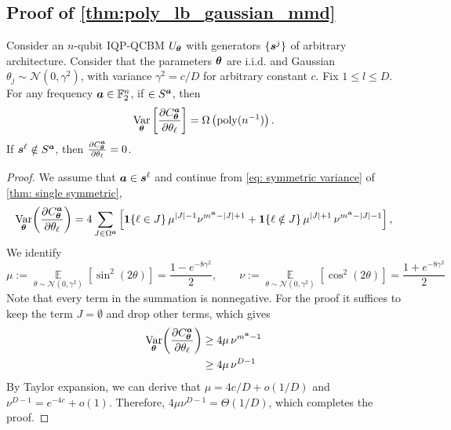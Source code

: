 \documentclass{article}
\theoremstyle{plain}
\theoremstyle{definition}
\theoremstyle{remark}
\begin{document}
\subsection{Proof of \cref{thm:poly_lb_gaussian_mmd}}
Consider an $n$-qubit IQP-QCBM $U_{\bm{\theta}}$ with generators $\{{\bm{s}^j}\}$ of arbitrary architecture. Consider that the parameters ${\bm{\theta}}$ are i.i.d. and Gaussian $\theta_j \sim\mathcal{N}(0,\gamma^2)$, with variance $\gamma^2 = c/D$ for arbitrary constant $c$. Fix $1\leq l \leq D$. For any frequency ${\bm{a}} \in \mathbb{F}_2^n$, if $\in S^{\bm{a}}$, then 
\begin{equation}
\operatorname*{Var}_{{\bm{\theta}}} \left[ \frac{\partial C^{\bm{a}}_{\bm{\theta}}}{\partial \theta_\ell} \right] = \Omega\left(\mathrm{poly}(n^{-1})\right).
\end{equation} 
If ${\bm{s}^\ell} \notin S^{\bm{a}}$, then $\frac{\partial C^{\bm{a}}_{\bm{\theta}}}{\partial \theta_\ell}=0$.
\begin{proof}
We assume that ${\bm{a}} \in {\bm{s}^\ell}$ and continue from \cref{eq: symmetric variance} of \cref{thm: single symmetric},
\begin{equation}
\operatorname*{Var}_{{\bm{\theta}}}\!\left(\frac{\partial C_{\bm{\theta}}^{\bm{a}}}{\partial\theta_\ell}\right)
=
4\sum_{J\in \Omega^{\bm{a}}}
\left[
\bm{1}\{\ell\in J\}\,\mu^{|J|-1}\nu^{m^{\bm{a}}-|J|+1}
+
\bm{1}\{\ell\notin J\}\,\mu^{|J|+1}\,\nu^{m^{\bm{a}}-|J|-1}
\right],
\label{eq:single_var_exact_c}
\end{equation}
We identify \begin{equation}
    \mu:=\operatorname*{\mathbb{E}}_{\theta\sim\mathcal N(0,\gamma^2)}[\sin^2(2\theta)]
=\frac{1-e^{-8\gamma^2}}{2},
\qquad
\nu:=\operatorname*{\mathbb{E}}_{\theta\sim\mathcal N(0,\gamma^2)}[\cos^2(2\theta)]
=\frac{1+e^{-8\gamma^2}}{2}
\end{equation} 
Note that every term in the summation is nonnegative. For the proof it suffices to keep the term $J= \emptyset$ and drop other terms, which gives
\begin{align}
\operatorname*{Var}_{{\bm{\theta}}}\!\left(\frac{\partial C_{\bm{\theta}}^{\bm{a}}}{\partial\theta_\ell}\right) & \geq 
4\mu\,\nu^{m^{\bm{a}}-1} \\
& \geq  4\mu\,\nu^{D-1} 
\label{eq:single_var_lb_c}
\end{align}
By Taylor expansion, we can derive that $\mu = 4c/D + o(1/D)$ and $\nu^{D-1} = e^{-4c} + o(1)$. Therefore, $4\mu \nu^{D-1} =\Theta(1/D)$, which completes the proof.
\end{proof}

\newpage 
\end{document}
